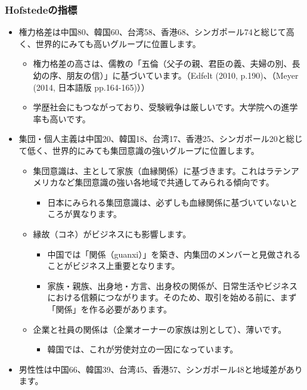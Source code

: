 \documentclass[
]{book}
\providecommand{\tightlist}{%
  \setlength{\itemsep}{0pt}\setlength{\parskip}{0pt}}
\begin{document}
\hypertarget{hofstedeux306eux6307ux6a19-2}{%
\subsubsection{Hofstedeの指標}\label{hofstedeux306eux6307ux6a19-2}}

\begin{itemize}
\item
  権力格差は中国80、韓国60、台湾58、香港68、シンガポール74と総じて高く、世界的にみても高いグループに位置します。

  \begin{itemize}
  \item
    権力格差の高さは、儒教の「五倫（父子の親、君臣の義、夫婦の別、長幼の序、朋友の信）」に基づいています。（Edfelt (2010, p.190)、（Meyer (2014, 日本語版 pp.164-165)））
  \item
    学歴社会にもつながっており、受験戦争は厳しいです。大学院への進学率も高いです。
  \end{itemize}
\item
  集団・個人主義は中国20、韓国18、台湾17、香港25、シンガポール20と総じて低く、世界的にみても集団意識の強いグループに位置します。

  \begin{itemize}
  \item
    集団意識は、主として家族（血縁関係）に基づきます。これはラテンアメリカなど集団意識の強い各地域で共通してみられる傾向です。

    \begin{itemize}
    \tightlist
    \item
      日本にみられる集団意識は、必ずしも血縁関係に基づいていないところが異なります。
    \end{itemize}
  \item
    縁故（コネ）がビジネスにも影響します。

    \begin{itemize}
    \item
      中国では「関係（guanxi）」を築き、内集団のメンバーと見做されることがビジネス上重要となります。
    \item
      家族・親族、出身地・方言、出身校の関係が、日常生活やビジネスにおける信頼につながります。そのため、取引を始める前に、まず「関係」を作る必要があります。
    \end{itemize}
  \item
    企業と社員の関係は（企業オーナーの家族は別として）、薄いです。

    \begin{itemize}
    \tightlist
    \item
      韓国では、これが労使対立の一因になっています。
    \end{itemize}
  \end{itemize}
\item
  男性性は中国66、韓国39、台湾45、香港57、シンガポール48と地域差があります。


\end{itemize}
\end{document}
